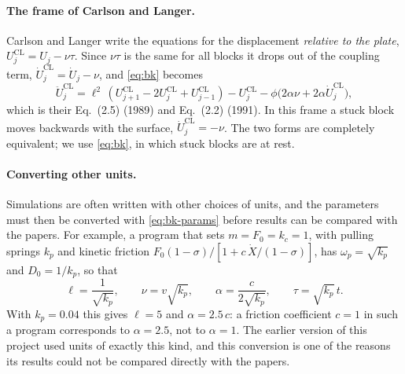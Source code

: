 \paragraph{The frame of Carlson and Langer.} Carlson and Langer write the equations for the displacement
\emph{relative to the plate}, $U^{\text{CL}}_j = U_j - \nu\tau$. Since $\nu\tau$ is the same for all blocks it drops
out of the coupling term, $\dot U^{\text{CL}}_j = \dot U_j - \nu$, and \cref{eq:bk} becomes
\begin{equation}
  \ddot U^{\text{CL}}_j = \ell^2\,(U^{\text{CL}}_{j+1}-2U^{\text{CL}}_j+U^{\text{CL}}_{j-1}) - U^{\text{CL}}_j
  - \phi\bigl(2\alpha\nu + 2\alpha\dot U^{\text{CL}}_j\bigr),
  \label{eq:bk-CL}
\end{equation}
which is their Eq.~(2.5) (1989) and Eq.~(2.2) (1991). In this frame a stuck block moves backwards with the
surface, $\dot U^{\text{CL}}_j = -\nu$. The two forms are completely equivalent; we use \cref{eq:bk}, in which
stuck blocks are at rest.

\paragraph{Converting other units.} Simulations are often written with other choices of units, and the
parameters must then be converted with \cref{eq:bk-params} before results can be compared with the papers. For
example, a program that sets $m = F_0 = k_c = 1$, with pulling springs $k_p$ and kinetic friction
$F_0(1-\sigma)/[1 + c\,\dot X/(1-\sigma)]$, has $\omega_p = \sqrt{k_p}$ and $D_0 = 1/k_p$, so that
\begin{equation}
  \ell = \frac{1}{\sqrt{k_p}},\qquad \nu = v\sqrt{k_p},\qquad \alpha = \frac{c}{2\sqrt{k_p}},\qquad \tau = \sqrt{k_p}\,t .
\end{equation}
With $k_p = 0.04$ this gives $\ell = 5$ and $\alpha = 2.5\,c$: a friction coefficient $c = 1$ in such a program
corresponds to $\alpha = 2.5$, not to $\alpha=1$. The earlier version of this project used units of exactly this
kind, and this conversion is one of the reasons its results could not be compared directly with the papers.

